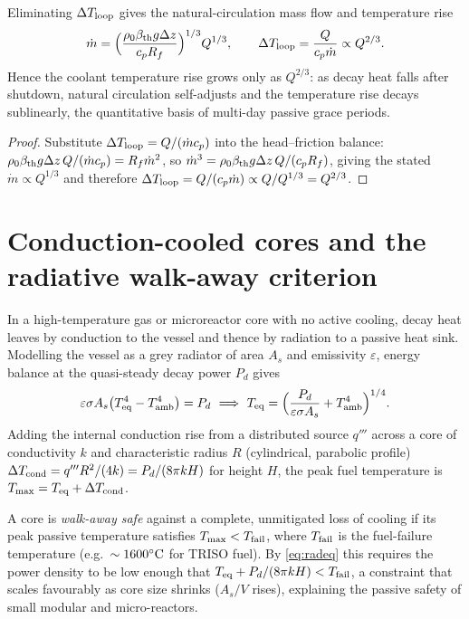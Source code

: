 \begin{proposition}
\label{prop:natcirc}
Eliminating $\Delta T_{\rm loop}$ gives the natural-circulation mass flow and
temperature rise
\begin{equation}
\dot m=\Big(\frac{\rho_0\beta_{\rm th}g\Delta z}{c_p R_f}\Big)^{1/3}Q^{1/3},
\qquad
\Delta T_{\rm loop}=\frac{Q}{c_p\dot m}\propto Q^{2/3}.
\end{equation}
Hence the coolant temperature rise grows only as $Q^{2/3}$: as decay heat falls
after shutdown, natural circulation self-adjusts and the temperature rise decays
sublinearly, the quantitative basis of multi-day passive grace periods.
\end{proposition}
\begin{proof}
Substitute $\Delta T_{\rm loop}=Q/(\dot m c_p)$ into the head--friction balance:
$\rho_0\beta_{\rm th}g\Delta z\,Q/(\dot m c_p)=R_f\dot m^2$, so
$\dot m^3=\rho_0\beta_{\rm th}g\Delta z\,Q/(c_p R_f)$, giving the stated
$\dot m\propto Q^{1/3}$ and therefore $\Delta T_{\rm loop}=Q/(c_p\dot m)\propto
Q/Q^{1/3}=Q^{2/3}$.
\end{proof}

\section{Conduction-cooled cores and the radiative walk-away criterion}
\label{sec:walkaway}

In a high-temperature gas or microreactor core with no active cooling, decay heat
leaves by conduction to the vessel and thence by radiation to a passive heat sink.
Modelling the vessel as a grey radiator of area $A_s$ and emissivity
$\varepsilon$, energy balance at the quasi-steady decay power $P_d$ gives
\begin{equation}
\varepsilon\sigma A_s\big(T_{\rm eq}^4-T_{\rm amb}^4\big)=P_d
\ \Longrightarrow\
T_{\rm eq}=\Big(\frac{P_d}{\varepsilon\sigma A_s}+T_{\rm amb}^4\Big)^{1/4}.
\label{eq:radeq}
\end{equation}
Adding the internal conduction rise from a distributed source $q'''$ across a core
of conductivity $k$ and characteristic radius $R$ (cylindrical, parabolic profile)
$\Delta T_{\rm cond}=q''' R^2/(4k)=P_d/(8\pi k H)$ for height $H$, the peak fuel
temperature is $T_{\max}=T_{\rm eq}+\Delta T_{\rm cond}$.

\begin{definition}
A core is \emph{walk-away safe} against a complete, unmitigated loss of cooling if
its peak passive temperature satisfies $T_{\max}<T_{\rm fail}$, where
$T_{\rm fail}$ is the fuel-failure temperature (e.g.\ $\sim1600^{\circ}\mathrm{C}$ for TRISO
fuel). By \eqref{eq:radeq} this requires the power density to be low enough that
$T_{\rm eq}+P_d/(8\pi k H)<T_{\rm fail}$, a constraint that scales favourably as
core size shrinks ($A_s/V$ rises), explaining the passive safety of small modular
and micro-reactors.
\end{definition}

